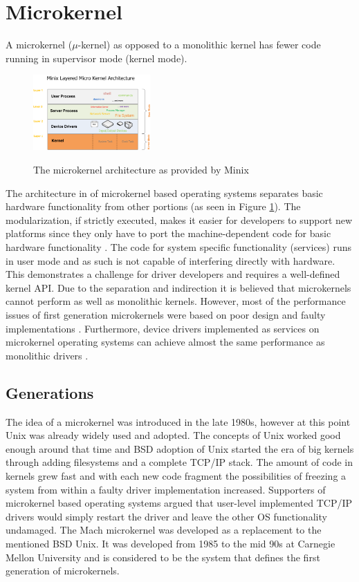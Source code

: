 \documentclass{acm_proc_article-sp}
\begin{document}
\section{Microkernel}
\label{sec:microkernel}
A microkernel ($\mu$-kernel) as opposed to a monolithic kernel has fewer code running in
supervisor mode (kernel mode).
\begin{figure}
\centering
\includegraphics[width=0.4\textwidth]{minixinternalstructure.png}
\label{fig:minixmicarch}
\caption{The microkernel architecture as provided by Minix \cite{minix}}
\end{figure}
The architecture in of microkernel based operating systems separates basic
hardware functionality from other portions (as seen in Figure \ref{fig:minixmicarch}).
The modularization, if strictly executed, makes it easier for developers to support new
platforms since they only have to port the machine-dependent code for basic hardware functionality \cite{black92}.
The code for system specific functionality (services) runs in user mode and as such
is not capable of interfering directly with hardware.
This demonstrates a challenge for driver developers and requires a well-defined kernel API.
Due to the separation and indirection it is believed that microkernels cannot perform as well as
monolithic kernels.
However, most of the performance issues of first generation microkernels were based on poor design
and faulty implementations \cite{p237-liedtke}.
Furthermore, device drivers implemented as services on microkernel operating systems can achieve
almost the same performance as monolithic drivers \cite{uldd}.

\subsection{Generations}
The idea of a microkernel was introduced in the late 1980s, however at this point Unix \cite{unix}
was already widely used and adopted.
The concepts of Unix worked good enough around that time and BSD \cite{bsd} adoption of Unix started
the era of big kernels through adding filesystems and a complete TCP/IP stack. %
The amount of code in kernels grew fast and with each new code fragment the possibilities of
freezing a system from within a faulty driver implementation increased.
Supporters of microkernel based operating systems argued that user-level implemented TCP/IP drivers
would simply restart the driver and leave the other OS functionality undamaged.
The Mach \cite{mach} microkernel was developed as a replacement to the mentioned BSD Unix.
It was developed from 1985 to the mid 90s at Carnegie Mellon University and is considered to be
the system that defines the first generation of microkernels.
\end{document}
